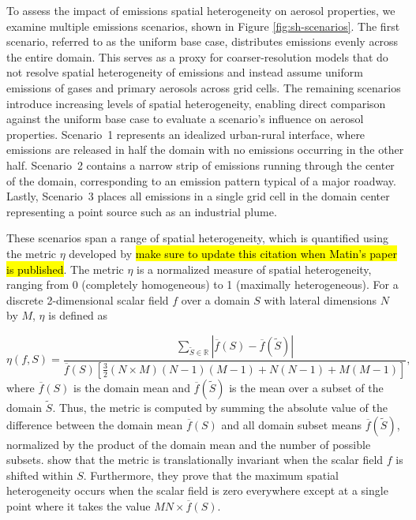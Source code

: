 \documentclass[journal abbreviation, manuscript]{copernicus}
\begin{document}
To assess the impact of emissions spatial heterogeneity on aerosol
properties, we examine multiple emissions scenarios, shown in Figure
\ref{fig:sh-scenarios}. The first scenario, referred to as the uniform
base case, distributes emissions evenly across the entire domain. This
serves as a proxy for coarser-resolution models that do not resolve
spatial heterogeneity of emissions and instead assume uniform
emissions of gases and primary aerosols across grid cells. The
remaining scenarios introduce increasing levels of spatial
heterogeneity, enabling direct comparison against the uniform base
case to evaluate a scenario's influence on aerosol properties. Scenario~1
represents an idealized urban-rural interface, where emissions are
released in half the domain with no emissions occurring in the other
half. Scenario~2 contains a narrow strip of emissions running through
the center of the domain, corresponding to an emission pattern typical
of a major roadway. Lastly, Scenario~3 places all emissions in a
single grid cell in the domain center representing a point source such
as an industrial plume.

These scenarios span a range of spatial heterogeneity, which is
quantified using the metric $\eta$ developed by
\citep{mohebalhojeh_2024} \hl{make sure to update this citation when
  Matin's paper is published}. The metric $\eta$ is a normalized
measure of spatial heterogeneity, ranging from 0 (completely
homogeneous) to 1 (maximally heterogeneous). For a discrete
2-dimensional scalar field $f$ over a domain $S$ with lateral
dimensions $N$ by $M$, $\eta$ is defined as

\begin{equation}
\eta(f, S) = \frac{\sum_{\tilde{S}\in \mathbb{R}}|\overline{f}(S) - \overline{f}(\tilde{S})|}{\overline{f}(S)\left[\frac{3}{2}(N\times M)(N-1)(M-1) + N(N-1) + M(M-1)\right]}, 
\end{equation}
where $\overline{f}(S)$ is the domain mean and
$\overline{f}(\tilde{S})$ is the mean over a subset of the domain
$\tilde{S}$. Thus, the metric is computed by summing the absolute
value of the difference between the domain mean $\overline{f}(S)$ and
all domain subset means $\overline{f}(\tilde{S})$, normalized by the
product of the domain mean and the number of possible
subsets. \citet{mohebalhojeh_2024} show that the metric is
translationally invariant when the scalar field $f$ is shifted within
$S$. Furthermore, they prove that the
maximum spatial heterogeneity occurs when the
scalar field is zero everywhere except at a single point
where it takes the value $MN\times\overline{f}(S)$.
\end{document}
